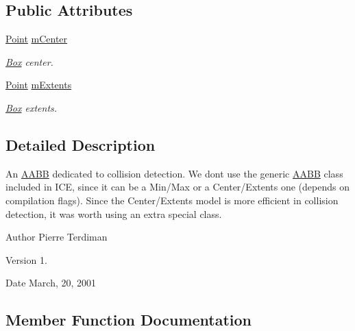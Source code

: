 \subsection*{Public Attributes}
\begin{DoxyCompactItemize}
\item 
\hyperlink{classPoint}{Point} \hyperlink{classCollisionAABB_a4be227d0bf648dcfefb6f8bb0cb7b4d3}{m\+Center}\hypertarget{classCollisionAABB_a4be227d0bf648dcfefb6f8bb0cb7b4d3}{}\label{classCollisionAABB_a4be227d0bf648dcfefb6f8bb0cb7b4d3}

\begin{DoxyCompactList}\small\item\em \hyperlink{classBox}{Box} center. \end{DoxyCompactList}\item 
\hyperlink{classPoint}{Point} \hyperlink{classCollisionAABB_a8c66d75004d57c817e73fe16e263e87d}{m\+Extents}\hypertarget{classCollisionAABB_a8c66d75004d57c817e73fe16e263e87d}{}\label{classCollisionAABB_a8c66d75004d57c817e73fe16e263e87d}

\begin{DoxyCompactList}\small\item\em \hyperlink{classBox}{Box} extents. \end{DoxyCompactList}\end{DoxyCompactItemize}


\subsection{Detailed Description}
An \hyperlink{classAABB}{A\+A\+BB} dedicated to collision detection. We don\textquotesingle{}t use the generic \hyperlink{classAABB}{A\+A\+BB} class included in I\+CE, since it can be a Min/\+Max or a Center/\+Extents one (depends on compilation flags). Since the Center/\+Extents model is more efficient in collision detection, it was worth using an extra special class.

\begin{DoxyAuthor}{Author}
Pierre Terdiman 
\end{DoxyAuthor}
\begin{DoxyVersion}{Version}
1. 
\end{DoxyVersion}
\begin{DoxyDate}{Date}
March, 20, 2001 
\end{DoxyDate}


\subsection{Member Function Documentation}
